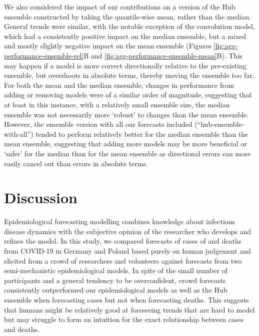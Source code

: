 \documentclass[10pt,letterpaper]{article}
\begin{document}
We also considered the impact of our contributions on a version of the
Hub ensemble constructed by taking the quantile-wise mean, rather than
the median. General trends were similar, with the notable exception of
the convolution model, which had a consistently positive impact on the
median ensemble, but a mixed and mostly slightly negative impact on the
mean ensemble (Figures \ref{fig:agg-performance-ensemble-rel}B and
\ref{fig:agg-performance-ensemble-mean}B). This may happen if a model is
more correct directionally relative to the pre-existing ensemble, but
overshoots in absolute terms, thereby moving the ensemble too far. For
both the mean and the median ensemble, changes in performance from
adding or removing models were of a similar order of magnitude,
suggesting that at least in this instance, with a relatively small
ensemble size, the median ensemble was not necessarily more `robust' to
changes than the mean ensemble. However, the ensemble version with all
our forecasts included (``hub-ensemble-with-all'') tended to perform
relatively better for the median ensemble than the mean ensemble,
suggesting that adding more models may be more beneficial or `safer' for
the median than for the mean ensemble as directional errors can more
easily cancel out than errors in absolute terms.

\hypertarget{discussion}{%
\section{Discussion}\label{discussion}}

Epidemiological forecasting modelling combines knowledge about
infectious disease dynamics with the subjective opinion of the
researcher who develops and refines the model. In this study, we
compared forecasts of cases of and deaths from COVID-19 in Germany and
Poland based purely on human judgement and elicited from a crowd of
researchers and volunteers against forecasts from two semi-mechanistic
epidemiological models. In spite of the small number of participants and
a general tendency to be overconfident, crowd forecasts consistently
outperformed our epidemiological models as well as the Hub ensemble when
forecasting cases but not when forecasting deaths. This suggests that
humans might be relatively good at foreseeing trends that are hard to
model but may struggle to form an intuition for the exact relationship
between cases and deaths.
\end{document}
